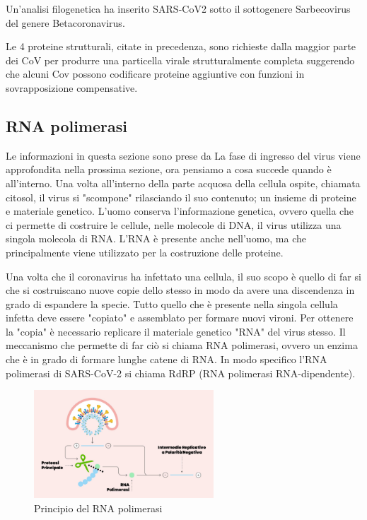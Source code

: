 Un'analisi filogenetica ha inserito SARS-CoV2 sotto il sottogenere Sarbecovirus del genere Betacoronavirus. 

Le 4 proteine strutturali, citate in precedenza, sono richieste dalla maggior parte dei CoV per produrre una particella virale strutturalmente completa suggerendo che alcuni Cov possono codificare proteine aggiuntive con funzioni in sovrapposizione compensative.

\subsection{RNA polimerasi}\label{subsec:es_subsec}
Le informazioni in questa sezione sono prese da \cite{RNApolimerasi}
La fase di ingresso del virus viene approfondita nella prossima sezione, ora pensiamo a cosa succede quando è all'interno. Una volta all'interno della parte acquosa della cellula ospite, chiamata citosol, il virus si "scompone" rilasciando il suo contenuto; un insieme di proteine e materiale genetico. L'uomo conserva l'informazione genetica, ovvero quella che ci permette di costruire le cellule, nelle molecole di DNA, il virus utilizza una singola molecola di RNA. L'RNA è presente anche nell'uomo, ma che principalmente viene utilizzato per la costruzione delle proteine. 

Una volta che il coronavirus ha infettato una cellula, il suo scopo è quello di far si che si costruiscano nuove copie dello stesso in modo da avere una discendenza in grado di espandere la specie. Tutto quello che è presente nella singola cellula infetta deve essere "copiato" e assemblato per formare nuovi vironi. Per ottenere la "copia" è necessario replicare il materiale genetico "RNA" del virus stesso. Il meccanismo che permette di far ciò si chiama RNA polimerasi, ovvero un enzima che è in grado di formare lunghe catene di RNA. In modo specifico l'RNA polimerasi di SARS-CoV-2 si chiama RdRP (RNA polimerasi RNA-dipendente). 

\begin{figure}
	\centering
	\includegraphics[width=0.6\textwidth]{Immagini/RNA_polimerasi.png}
	\caption{Principio del RNA polimerasi}
	\label{fig:Amminoacido}
\end{figure}

